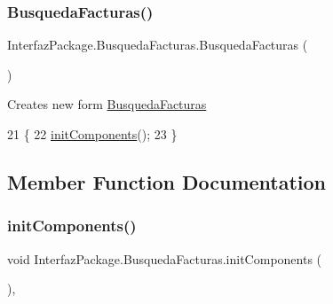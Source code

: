 \subsubsection{\texorpdfstring{Busqueda\+Facturas()}{BusquedaFacturas()}}
{\footnotesize\ttfamily Interfaz\+Package.\+Busqueda\+Facturas.\+Busqueda\+Facturas (\begin{DoxyParamCaption}{ }\end{DoxyParamCaption})\hspace{0.3cm}{\ttfamily [inline]}}

Creates new form \mbox{\hyperlink{class_interfaz_package_1_1_busqueda_facturas}{Busqueda\+Facturas}} 
\begin{DoxyCode}
21                               \{
22         \mbox{\hyperlink{class_interfaz_package_1_1_busqueda_facturas_a825a805ad4894078abce578e267f0c95}{initComponents}}();
23     \}
\end{DoxyCode}


\subsection{Member Function Documentation}
\mbox{\label{class_interfaz_package_1_1_busqueda_facturas_a825a805ad4894078abce578e267f0c95}} 
\subsubsection{\texorpdfstring{init\+Components()}{initComponents()}}
{\footnotesize\ttfamily void Interfaz\+Package.\+Busqueda\+Facturas.\+init\+Components (\begin{DoxyParamCaption}{ }\end{DoxyParamCaption})\hspace{0.3cm}{\ttfamily [inline]}, {\ttfamily [private]}}

